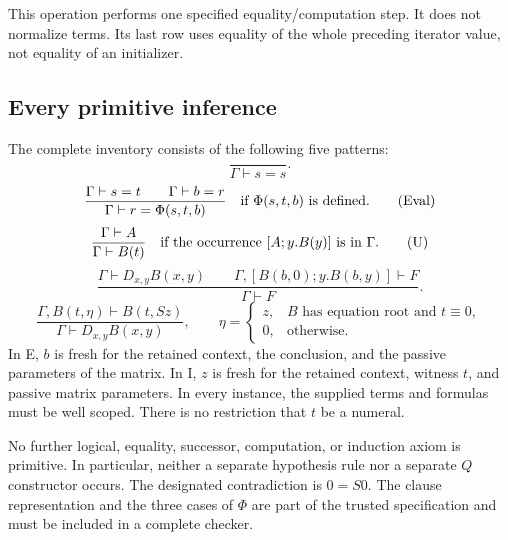 This operation performs one specified equality/computation step. It
does not normalize terms. Its last row uses equality of the whole
preceding iterator value, not equality of an initializer.

\subsection{Every primitive inference}

The complete inventory consists of the following five patterns:
\[
 \frac{}{\Gamma\vdash s=s}.                              \tag{Refl}
\]
\[
 \frac{\Gamma\vdash s=t\qquad\Gamma\vdash b=r}
      {\Gamma\vdash r=\Phi(s,t,b)}
 \quad\hbox{if $\Phi(s,t,b)$ is defined}.                \tag{Eval}
\]
\[
 \frac{\Gamma\vdash A}{\Gamma\vdash B(t)}
 \quad\hbox{if the occurrence $[A;y.B(y)]$ is in $\Gamma$}.
                                                               \tag{U}
\]
\[
 \frac{\Gamma\vdash D_{x,y}B(x,y)\qquad
       \Gamma,[B(b,0);y.B(b,y)]\vdash F}
      {\Gamma\vdash F}.                                 \tag{E}
\]
\[
 \frac{\Gamma,B(t,\eta)\vdash B(t,Sz)}
      {\Gamma\vdash D_{x,y}B(x,y)},\qquad
 \eta=
 \begin{cases}
 z,&B\text{ has equation root and }t\equiv0,\\
 0,&\text{otherwise}.
 \end{cases}                                           \tag{I}
\]
In E, $b$ is fresh for the retained context, the conclusion, and the
passive parameters of the matrix. In I, $z$ is fresh for the retained
context, witness $t$, and passive matrix parameters. In every instance,
the supplied terms and formulas must be well scoped. There is no
restriction that $t$ be a numeral.

No further logical, equality, successor, computation, or induction axiom
is primitive. In particular, neither a separate hypothesis rule nor a
separate $Q$ constructor occurs. The designated contradiction is $0=S0$.
The clause representation and the three cases of $\Phi$ are part of the
trusted specification and must be included in a complete checker.


